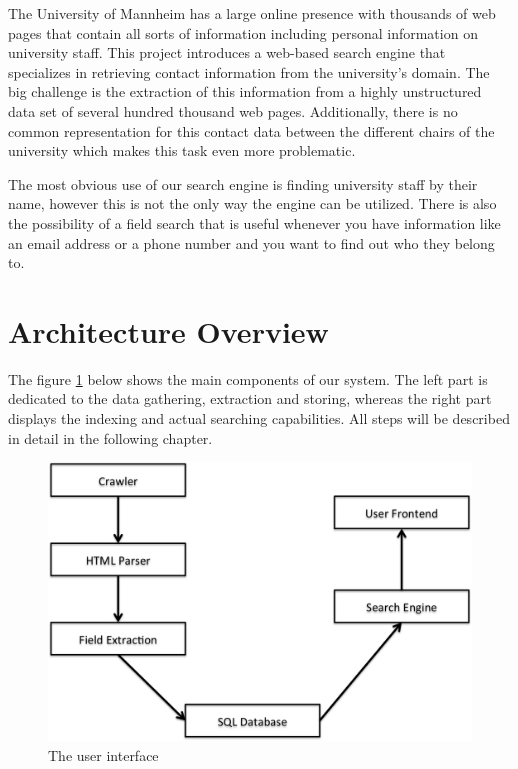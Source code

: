 \documentclass[11pt,titlepage,oneside,openany]{article}
\begin{document}
The University of Mannheim has a large online presence with thousands of web pages that contain all sorts of information including personal information on university staff. This project introduces a web-based search engine that specializes in retrieving contact information from the university’s domain. The big challenge is the extraction of this information from a highly unstructured data set of several hundred thousand web pages. Additionally, there is no common representation for this contact data between the different chairs of the university which makes this task even more problematic.

The most obvious use of our search engine is finding university staff by their name, however this is not the only way the engine can be utilized. There is also the possibility of a field search that is useful whenever you have information like an email address or a phone number and you want to find out who they belong to.



\section{Architecture Overview}
The figure \ref{fig:overview} below shows the main components of our system. The left part is dedicated to the data gathering, extraction and storing, whereas the right part displays the indexing and actual searching capabilities. All steps will be described in detail in the following chapter.

\begin{figure}[htb]
  \begin{center}
   \includegraphics[width=1.0\textwidth]{figures/overview.png}
  \end{center}
  \caption{The user interface}
    \label{fig:overview}
\end{figure}
\end{document}
